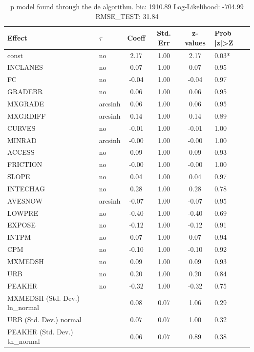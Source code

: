\begin{table}
	\caption{p model found through the de algorithm. bic: 1910.89 Log-Likelihood: -704.99 RMSE_TEST: 31.84}
	\begin{center}
		\begin{tabular}{|l|l|c|c|c|l|}
			\hline
			Effect & $\tau$ & Coeff & Std. Err & z-values & Prob |z|>Z \\
			\hline
			const & no & 2.17 & 1.00 & 2.17 & 0.03* \\
			\hline
			INCLANES & no & 0.07 & 1.00 & 0.07 & 0.95 \\
			\hline
			FC & no & -0.04 & 1.00 & -0.04 & 0.97 \\
			\hline
			GRADEBR & no & 0.06 & 1.00 & 0.06 & 0.95 \\
			\hline
			MXGRADE & arcsinh & 0.06 & 1.00 & 0.06 & 0.95 \\
			\hline
			MXGRDIFF & arcsinh & 0.14 & 1.00 & 0.14 & 0.89 \\
			\hline
			CURVES & no & -0.01 & 1.00 & -0.01 & 1.00 \\
			\hline
			MINRAD & arcsinh & -0.00 & 1.00 & -0.00 & 1.00 \\
			\hline
			ACCESS & no & 0.09 & 1.00 & 0.09 & 0.93 \\
			\hline
			FRICTION & no & -0.00 & 1.00 & -0.00 & 1.00 \\
			\hline
			SLOPE & no & 0.04 & 1.00 & 0.04 & 0.97 \\
			\hline
			INTECHAG & no & 0.28 & 1.00 & 0.28 & 0.78 \\
			\hline
			AVESNOW & arcsinh & -0.07 & 1.00 & -0.07 & 0.95 \\
			\hline
			LOWPRE & no & -0.40 & 1.00 & -0.40 & 0.69 \\
			\hline
			EXPOSE & no & -0.12 & 1.00 & -0.12 & 0.91 \\
			\hline
			INTPM & no & 0.07 & 1.00 & 0.07 & 0.94 \\
			\hline
			CPM & no & -0.10 & 1.00 & -0.10 & 0.92 \\
			\hline
			MXMEDSH & no & 0.09 & 1.00 & 0.09 & 0.93 \\
			\hline
			URB & no & 0.20 & 1.00 & 0.20 & 0.84 \\
			\hline
			PEAKHR & no & -0.32 & 1.00 & -0.32 & 0.75 \\
			\hline
			MXMEDSH (Std. Dev.) ln_normal &  & 0.08 & 0.07 & 1.06 & 0.29 \\
			\hline
			URB (Std. Dev.) normal &  & 0.07 & 0.07 & 1.00 & 0.32 \\
			\hline
			PEAKHR (Std. Dev.) tn_normal &  & 0.06 & 0.07 & 0.89 & 0.38 \\
			\hline
		\end{tabular}
	\end{center}
\end{table}